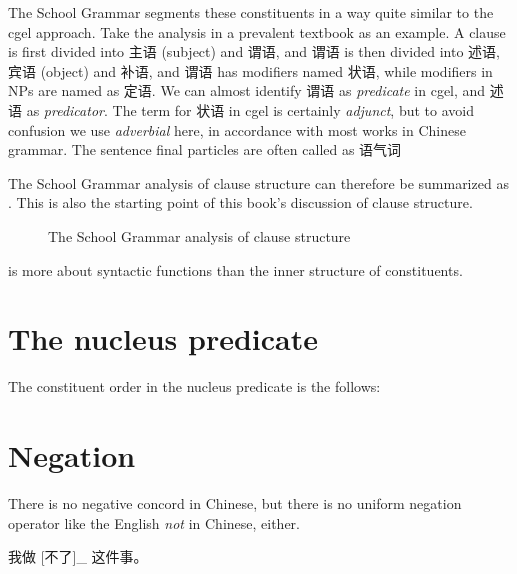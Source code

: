 \documentclass[../main.tex]{subfiles}
\begin{document}
The School Grammar segments these constituents in a way quite similar to the \ac{cgel} approach. 
Take the analysis in a prevalent textbook \citet[]{xianhan2004} as an example.
A clause is first divided into 主语 (subject) and 谓语, and 谓语 is then divided into 述语, 宾语 (object) and 补语,
and 谓语 has modifiers named 状语, while modifiers in NPs are named as 定语. We can almost identify 
谓语 as \emph{predicate} in \ac{cgel}, and 述语 as \emph{predicator}. 
The term for 状语 in \ac{cgel} is certainly \emph{adjunct}, but to avoid confusion we use \emph{adverbial}
here, in accordance with most works in Chinese grammar. 
The sentence final particles are often called as 语气词 %

The School Grammar analysis of clause structure can therefore 
be summarized as .
This is also the starting point of this book's discussion of clause structure. 

\begin{figure}
    \centering
    
    \caption{The School Grammar analysis of clause structure}
    \label{fig:school-grammar-clause}
\end{figure}

 is more about syntactic functions than the inner structure of constituents.

\section{The nucleus predicate}

The constituent order in the nucleus predicate is the follows:
\begin{exe}
    \ex 
\end{exe}

\section{Negation}

There is no negative concord in Chinese, 
but there is no uniform negation operator like the English \emph{not} in Chinese, either. 

\begin{exe}
    \ex \begin{xlist}
        \ex 我做 [不了]_{} 这件事。
    \end{xlist}    
\end{exe}

\end{document}
